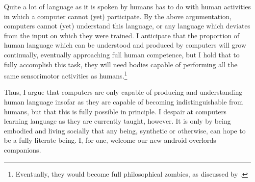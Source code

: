 \documentclass[man,12pt,natbib]{apa6}
\begin{document}
Quite a lot of language as it is spoken by humans has to do with human
activities in which a computer cannot (yet) participate. By the above
argumentation, computers cannot (yet) understand this language, or any language
which deviates from the input on which they were trained. I anticipate that the
proportion of human language which can be understood and produced by computers
will grow continually, eventually approaching full human competence, but I hold
that to fully accomplish this task, they will need bodies capable of performing
all the same sensorimotor activities as humans.\footnote{Eventually, they would
become full philosophical zombies, as discussed by \citet{Chalmers96}.}

Thus, I argue that computers are only capable of producing and understanding
human language insofar as they are capable of becoming indistinguishable from
humans, but that this is fully possible in principle. I despair at computers
learning language as they are currently taught, however. It is only by being
embodied and living socially that any being, synthetic or otherwise, can hope
to be a fully literate being. I, for one, welcome our new android
\st{overlords} companions.

\clearpage

\end{document}

